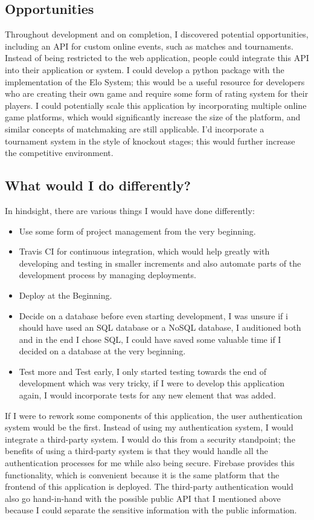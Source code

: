 \subsection{Opportunities}
Throughout development and on completion, I discovered potential opportunities, including an API for custom online events, such as matches and tournaments. Instead of being restricted to the web application, people could integrate this API into their application or system. I could develop a python package with the implementation of the Elo System; this would be a useful resource for developers who are creating their own game and require some form of rating system for their players.
I could potentially scale this application by incorporating multiple online game platforms, which would significantly increase the size of the platform, and similar concepts of matchmaking are still applicable. I'd incorporate a tournament system in the style of knockout stages; this would further increase the competitive environment.

\subsection{What would I do differently?}

In hindsight, there are various things I would have done differently:
\begin{itemize}
	\item Use some form of project management from the very beginning.
	\item Travis CI for continuous integration, which would help greatly with developing and testing in smaller increments and also automate parts of the development process by managing deployments.
	\item Deploy at the Beginning.
	\item Decide on a database before even starting development, I was unsure if i should have used an SQL database or a NoSQL database, I auditioned both and in the end I chose SQL, I could have saved some valuable time if I decided on a database at the very beginning.
	\item Test more and Test early, I only started testing towards the end of development which was very tricky, if I were to develop this application again, I would incorporate tests for any new element that was added.
\end{itemize}

If I were to rework some components of this application, the user authentication system would be the first. Instead of using my authentication system, I would integrate a third-party system. I would do this from a security standpoint; the benefits of using a third-party system is that they would handle all the authentication processes for me while also being secure. Firebase provides this functionality, which is convenient because it is the same platform that the frontend of this application is deployed. The third-party authentication would also go hand-in-hand with the possible public API that I mentioned above because I could separate the sensitive information with the public information.

